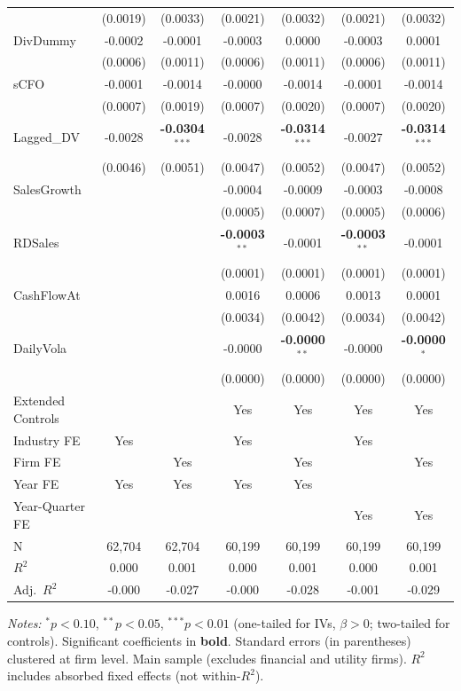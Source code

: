 \documentclass[11pt,a4paper]{article}
\begin{document}
\begin{table}[htbp]
\begin{tabular}{lcccccc}
 & (0.0019) & (0.0033) & (0.0021) & (0.0032) & (0.0021) & (0.0032) \\
DivDummy & -0.0002 & -0.0001 & -0.0003 & 0.0000 & -0.0003 & 0.0001 \\
 & (0.0006) & (0.0011) & (0.0006) & (0.0011) & (0.0006) & (0.0011) \\
sCFO & -0.0001 & -0.0014 & -0.0000 & -0.0014 & -0.0001 & -0.0014 \\
 & (0.0007) & (0.0019) & (0.0007) & (0.0020) & (0.0007) & (0.0020) \\
Lagged\_DV & -0.0028 & \textbf{-0.0304}$^{***}$ & -0.0028 & \textbf{-0.0314}$^{***}$ & -0.0027 & \textbf{-0.0314}$^{***}$ \\
 & (0.0046) & (0.0051) & (0.0047) & (0.0052) & (0.0047) & (0.0052) \\
SalesGrowth &  &  & -0.0004 & -0.0009 & -0.0003 & -0.0008 \\
 &  &  & (0.0005) & (0.0007) & (0.0005) & (0.0006) \\
RDSales &  &  & \textbf{-0.0003}$^{**}$ & -0.0001 & \textbf{-0.0003}$^{**}$ & -0.0001 \\
 &  &  & (0.0001) & (0.0001) & (0.0001) & (0.0001) \\
CashFlowAt &  &  & 0.0016 & 0.0006 & 0.0013 & 0.0001 \\
 &  &  & (0.0034) & (0.0042) & (0.0034) & (0.0042) \\
DailyVola &  &  & -0.0000 & \textbf{-0.0000}$^{**}$ & -0.0000 & \textbf{-0.0000}$^{*}$ \\
 &  &  & (0.0000) & (0.0000) & (0.0000) & (0.0000) \\
\midrule
Extended Controls &  &  & Yes & Yes & Yes & Yes \\
Industry FE & Yes &  & Yes &  & Yes &  \\
Firm FE &  & Yes &  & Yes &  & Yes \\
Year FE & Yes & Yes & Yes & Yes &  &  \\
Year-Quarter FE &  &  &  &  & Yes & Yes \\
\midrule
N & 62,704 & 62,704 & 60,199 & 60,199 & 60,199 & 60,199 \\
$R^2$ & 0.000 & 0.001 & 0.000 & 0.001 & 0.000 & 0.001 \\
Adj.~$R^2$ & -0.000 & -0.027 & -0.000 & -0.028 & -0.001 & -0.029 \\
\bottomrule
\end{tabular}
\begin{minipage}{\linewidth}
\vspace{2pt}\scriptsize
\textit{Notes:} $^{*}p<0.10$, $^{**}p<0.05$, $^{***}p<0.01$ (one-tailed for IVs, $\beta > 0$; two-tailed for controls).
 Significant coefficients in \textbf{bold}.
 Standard errors (in parentheses) clustered at firm level.
 Main sample (excludes financial and utility firms).
 $R^2$ includes absorbed fixed effects (not within-$R^2$).
\end{minipage}
\end{table}
\end{document}
